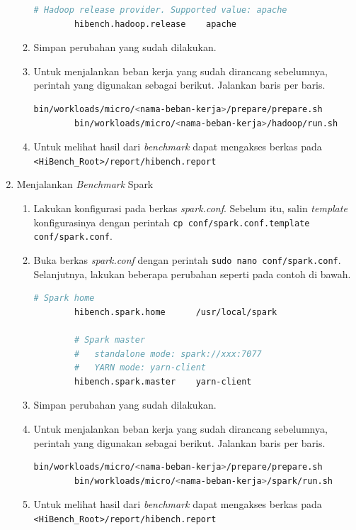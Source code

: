 \begin{enumerate}
\begin{enumerate}
\begin{lstlisting}[language=bash]
		# Hadoop release provider. Supported value: apache
		hibench.hadoop.release    apache
      \end{lstlisting}
    \item Simpan perubahan yang sudah dilakukan.
    \item Untuk menjalankan beban kerja yang sudah dirancang sebelumnya, perintah yang digunakan sebagai berikut. Jalankan baris per baris.
      \begin{lstlisting}[language=bash]
	    bin/workloads/micro/<nama-beban-kerja>/prepare/prepare.sh
	    bin/workloads/micro/<nama-beban-kerja>/hadoop/run.sh
      \end{lstlisting}
    \item Untuk melihat hasil dari \textit{benchmark} dapat mengakses berkas pada \verb|<HiBench_Root>/report/hibench.report|
  \end{enumerate}
  \item Menjalankan \textit{Benchmark} Spark
  \begin{enumerate}
    \item Lakukan konfigurasi pada berkas \textit{spark.conf}. Sebelum itu, salin \textit{template} konfigurasinya dengan perintah \verb|cp conf/spark.conf.template conf/spark.conf|.
    \item Buka berkas \textit{spark.conf} dengan perintah \verb|sudo nano conf/spark.conf|. Selanjutnya, lakukan beberapa perubahan seperti pada contoh di bawah.
      \begin{lstlisting}[language=bash]
		# Spark home
		hibench.spark.home      /usr/local/spark
		
		# Spark master
		#   standalone mode: spark://xxx:7077
		#   YARN mode: yarn-client
		hibench.spark.master    yarn-client
      \end{lstlisting}
    \item Simpan perubahan yang sudah dilakukan.
    \item Untuk menjalankan beban kerja yang sudah dirancang sebelumnya, perintah yang digunakan sebagai berikut. Jalankan baris per baris.
      \begin{lstlisting}[language=bash]
	    bin/workloads/micro/<nama-beban-kerja>/prepare/prepare.sh
	    bin/workloads/micro/<nama-beban-kerja>/spark/run.sh
      \end{lstlisting}
    \item Untuk melihat hasil dari \textit{benchmark} dapat mengakses berkas pada \verb|<HiBench_Root>/report/hibench.report|
  \end{enumerate}
\end{enumerate}




